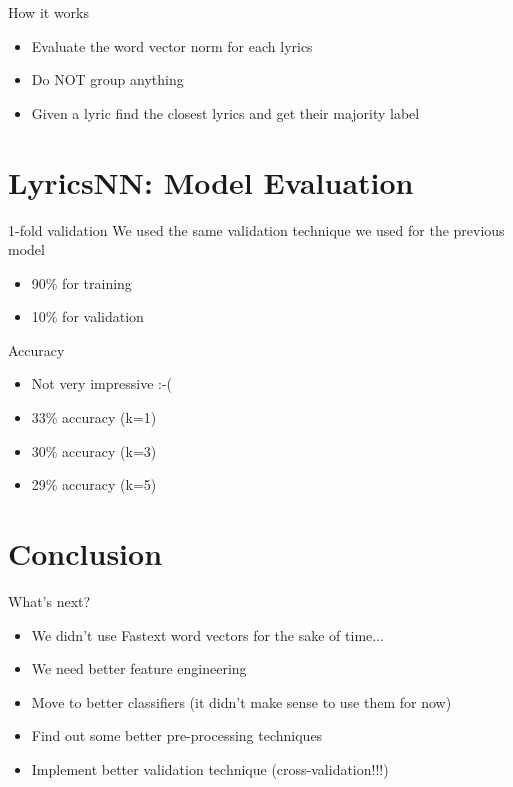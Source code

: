 \documentclass[xcolor=dvipsnames]{beamer}
\begin{document}
\begin{frame}{How it works}
\begin{itemize}
\item Evaluate the word vector norm for each lyrics
\item Do NOT group anything
\item Given a lyric find the closest lyrics and get their majority label
\end{itemize}
\end{frame}

\section{LyricsNN: Model Evaluation}

\begin{frame}{1-fold validation}
We used the same validation technique we used for the previous model
\begin{itemize}
\item 90\% for training
\item 10\% for validation
\end{itemize}
\end{frame}

\begin{frame}{Accuracy}
\begin{itemize}
\item Not very impressive :-(
\item 33\% accuracy (k=1)
\item 30\% accuracy (k=3)
\item 29\% accuracy (k=5)
\end{itemize}
\end{frame}

\section{Conclusion}

\begin{frame}{What's next?}
\begin{itemize}
\item We didn't use Fastext word vectors for the sake of time...
\item We need better feature engineering
\item Move to better classifiers (it didn't make sense to use them for now)
\item Find out some better pre-processing techniques
\item Implement better validation technique (cross-validation!!!)
\end{itemize}
\end{frame}
\end{document}
